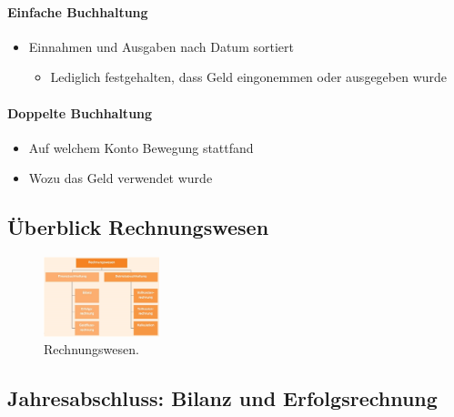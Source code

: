 \documentclass[../ZF_Wing.tex]{subfiles}
\begin{document}
\paragraph{Einfache Buchhaltung}
\begin{itemize}
	\item Einnahmen und Ausgaben nach Datum sortiert
	\begin{itemize}
		\item Lediglich festgehalten, dass Geld eingonemmen oder ausgegeben wurde
	\end{itemize}
\end{itemize}


\paragraph{Doppelte Buchhaltung}
\begin{itemize}
	\item Auf welchem Konto Bewegung stattfand
	\item Wozu das Geld verwendet wurde
\end{itemize}


\subsection{Überblick Rechnungswesen}
\begin{figure}[H]
\centering
\includegraphics[width=0.3\textwidth]{Resources/Image/Rechnungswesen.png}
\caption{\label{fig:Rechnungswesen}Rechnungswesen.}
\end{figure}

\subsection{Jahresabschluss: Bilanz und Erfolgsrechnung}
\end{document}
